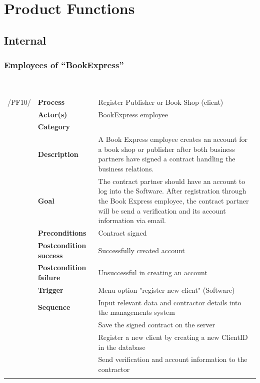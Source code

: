 \documentclass[11pt,a4paper,oneside,svgnames]{report}
\begin{document}
\chapter{Product Functions}

\section{Internal}
\subsection{Employees of ``BookExpress''}

\hfill \\

\begin{tabular}{p{1.5cm}p{3cm}p{8cm}}
/PF10/	& \textbf{Process}	& Register Publisher or Book Shop (client)\\
		& \textbf{Actor(s)} & BookExpress employee\\
		& \textbf{Category} & \\
		& \textbf{Description}	 & A Book Express employee creates an account for a book shop or publisher after both business partners have signed a contract handling the business relations.\\
		& \textbf{Goal} & The contract partner should have an account to log into the Software. After registration through the Book Express employee, the contract partner will be send a verification and its account information via email.\\
		& \textbf{Preconditions} & Contract signed\\
		& \textbf{Postcondition success} & Successfully created account\\
		& \textbf{Postcondition failure} & Unsuccessful in creating an account\\
		& \textbf{Trigger} & Menu option "register new client" (Software)\\
		& \textbf{Sequence} & Input relevant data and contractor details into the managements system\\
		& & Save the signed contract on the server\\
		& & Register a new client by creating a new ClientID in the database\\
		& & Send verification and account information to the contractor\\
\hfill \\
\end{tabular}
\end{document}
